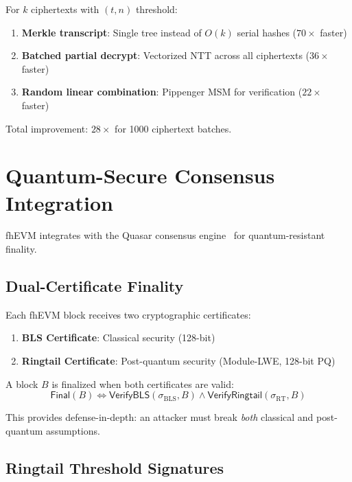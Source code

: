 \documentclass{../shared/luxfhe}
\begin{document}
For $k$ ciphertexts with $(t, n)$ threshold:

\begin{enumerate}
    \item \textbf{Merkle transcript}: Single tree instead of $O(k)$ serial hashes ($70\times$ faster)
    \item \textbf{Batched partial decrypt}: Vectorized NTT across all ciphertexts ($36\times$ faster)
    \item \textbf{Random linear combination}: Pippenger MSM for verification ($22\times$ faster)
\end{enumerate}

Total improvement: $28\times$ for 1000 ciphertext batches.

\section{Quantum-Secure Consensus Integration}

fhEVM integrates with the Quasar consensus engine~\cite{quasar} for quantum-resistant finality.

\subsection{Dual-Certificate Finality}

Each fhEVM block receives two cryptographic certificates:

\begin{enumerate}
    \item \textbf{BLS Certificate}: Classical security (128-bit)
    \item \textbf{Ringtail Certificate}: Post-quantum security (Module-LWE, 128-bit PQ)~\cite{ringtail}
\end{enumerate}

\begin{definition}
A block $B$ is finalized when both certificates are valid:
\[
\mathsf{Final}(B) \iff \mathsf{VerifyBLS}(\sigma_{\text{BLS}}, B) \land \mathsf{VerifyRingtail}(\sigma_{\text{RT}}, B)
\]
\end{definition}

This provides defense-in-depth: an attacker must break \emph{both} classical and post-quantum assumptions.

\subsection{Ringtail Threshold Signatures}
\end{document}
